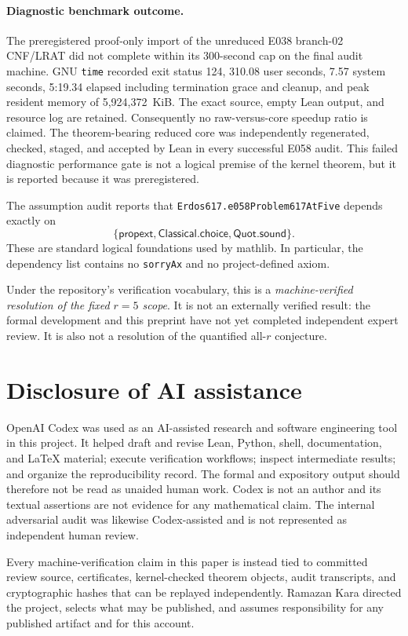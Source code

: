 \documentclass[11pt,reqno,a4paper]{amsart}
\theoremstyle{definition}
\theoremstyle{remark}
\newcommand{\code}[1]{\texttt{#1}}
\begin{document}
\paragraph{Diagnostic benchmark outcome.}
The preregistered proof-only import of the unreduced E038 branch-02
CNF/LRAT did not complete within its 300-second cap on the final audit
machine.  GNU \code{time} recorded exit status 124, 310.08 user seconds,
7.57 system seconds, 5:19.34 elapsed including termination grace and cleanup,
and peak resident memory of 5,924,372~KiB.  The exact source, empty Lean
output, and resource log are retained.  Consequently no raw-versus-core
speedup ratio is claimed.  The theorem-bearing reduced core was independently
regenerated, checked, staged, and accepted by Lean in every successful E058
audit.  This failed diagnostic performance gate is not a logical premise of
the kernel theorem, but it is reported because it was preregistered.

The assumption audit reports that
\code{Erdos617.e058Problem617AtFive} depends exactly on
\[
 \{\mathsf{propext},\mathsf{Classical.choice},\mathsf{Quot.sound}\}.
\]
These are standard logical foundations used by mathlib.  In particular, the
dependency list contains no \code{sorryAx} and no project-defined axiom.

Under the repository's verification vocabulary, this is a
\emph{machine-verified resolution of the fixed \(r=5\) scope}.  It is not an
externally verified result: the formal development and this preprint have not
yet completed independent expert review.  It is also not a resolution of the
quantified all-\(r\) conjecture.

\section{Disclosure of AI assistance}

OpenAI Codex was used as an AI-assisted research and software engineering
tool in this project.  It helped draft and revise Lean, Python, shell,
documentation, and \LaTeX{} material; execute verification workflows; inspect
intermediate results; and organize the reproducibility record.  The formal
and expository output should therefore not be read as unaided human work.
Codex is not an author and its textual assertions are not evidence for any
mathematical claim.  The internal adversarial audit was likewise
Codex-assisted and is not represented as independent human review.

Every machine-verification claim in this paper is instead tied to committed
review source, certificates, kernel-checked theorem objects, audit
transcripts, and cryptographic hashes that can be replayed independently.
Ramazan Kara directed the project, selects what may be published, and assumes
responsibility for any published artifact and for this account.
\end{document}
